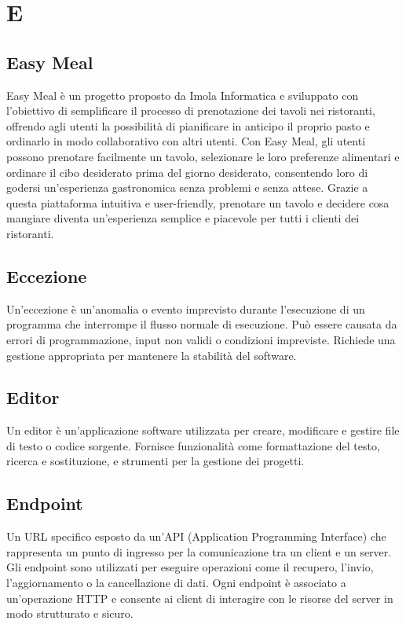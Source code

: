 \section*{E} 
\subsection*{Easy Meal} 
Easy Meal è un progetto proposto da Imola Informatica e sviluppato con l'obiettivo di semplificare il processo di prenotazione dei tavoli nei ristoranti, offrendo agli utenti la possibilità di pianificare in anticipo il proprio pasto e ordinarlo in modo collaborativo con altri utenti. Con Easy Meal, gli utenti possono prenotare facilmente un tavolo, selezionare le loro preferenze alimentari e ordinare il cibo desiderato prima del giorno desiderato, consentendo loro di godersi un'esperienza gastronomica senza problemi e senza attese. Grazie a questa piattaforma intuitiva e user-friendly, prenotare un tavolo e decidere cosa mangiare diventa un'esperienza semplice e piacevole per tutti i clienti dei ristoranti.
\subsection*{Eccezione} 
Un'eccezione è un'anomalia o evento imprevisto durante l'esecuzione di un programma che interrompe il flusso normale di esecuzione. Può essere causata da errori di programmazione, input non validi o condizioni impreviste. Richiede una gestione appropriata per mantenere la stabilità del software.
\subsection*{Editor} 
Un editor è un'applicazione software utilizzata per creare, modificare e gestire file di testo o codice sorgente. Fornisce funzionalità come formattazione del testo, ricerca e sostituzione, e strumenti per la gestione dei progetti.
\subsection*{Endpoint} 
Un URL specifico esposto da un'API (Application Programming Interface) che rappresenta un punto di ingresso per la comunicazione tra un client e un server. Gli endpoint sono utilizzati per eseguire operazioni come il recupero, l'invio, l'aggiornamento o la cancellazione di dati. Ogni endpoint è associato a un'operazione HTTP e consente ai client di interagire con le risorse del server in modo strutturato e sicuro.
